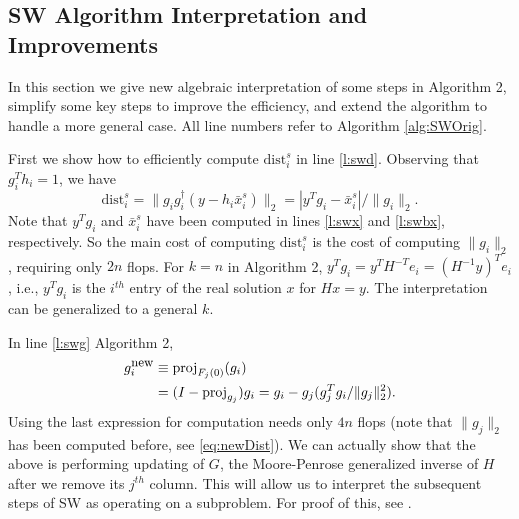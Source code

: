\documentclass[12pt,Bold,letterpaper]{mcgilletdclass}
\newcommand{\dist}{\mathrm{dist}}
\newcommand{\vsp}{\vspace{\baselineskip}}
\begin{document}
\vsp \subsection{SW Algorithm Interpretation and Improvements}
\label{sec:improvedSW}
In this section we give new algebraic interpretation of some steps in Algorithm 2,
simplify some key steps to improve the efficiency,
and  extend the algorithm to handle a more general case.
All line numbers refer to Algorithm \ref{alg:SWOrig}.

First we show  how to efficiently compute $\dist_i^s$ in line \ref{l:swd}. 
Observing that $g_i^Th_i = 1$, we have
\begin{equation}
\label{eq:newDist}
\dist_i^s =   \|  g_ig_i^\dag (y-h_i\bar{x}_i^s)  \|_2 
=    | y^Tg_i -\bar{x}_i^s |/\| g_i  \|_2.
\end{equation} 
Note that $y^Tg_i$ and $\bar{x}_i^s$ have been computed in lines \ref{l:swx} and \ref{l:swbx}, respectively.
So the main cost of computing $\dist_i^s$ is the cost of computing $\|g_i\|_2$,
requiring only $2n$ flops. 
For $k=n$ in Algorithm 2,  $y^Tg_i=y^TH^{-T}e_i=(H^{-1}y)^Te_i$, i.e.,  $y^Tg_i$
is the $i^{th}$ entry of the real solution $x$ for $Hx=y$. 
The interpretation can be generalized to  a general $k$. 

In line \ref{l:swg} Algorithm 2,  
\begin{align}
g_i^{\small \mbox{new}} & \equiv \mbox{proj}_{F_j(0)}(g_i)   \nonumber \\
  & =(I- \mbox{proj}_{g_j})g_i=g_i- g_j(g_j^Tg_i/\|g_j\|_2^2). \label{eq:gup}
\end{align}
Using the last expression for computation needs only $4n$ flops
(note that $\|g_j\|_2$ has been computed before, see \eqref{eq:newDist}).
We can actually show that the above is performing updating of $G$, the Moore-Penrose generalized inverse of
$H$ after we remove its $j^{th}$ column. This will allow us to interpret the subsequent steps of SW as operating on a subproblem. For proof of this, see \cite{Cli64}.
\end{document}
